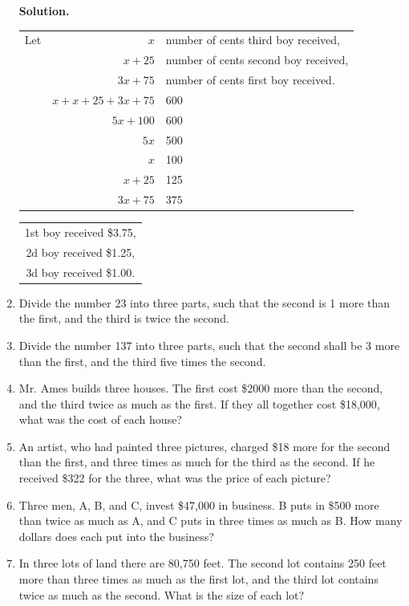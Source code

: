 \documentclass{book}
\begin{document}
\begin{enumerate}
\begin{center}
\textbf{ Solution.}\\
\begin{tabular}{lr@{=}l}
Let &$x$& number of cents third boy received,\\
&$x + 25$&  number of cents second boy received,\\
&$3x + 75$& number of cents first boy received.\\
&$x + x + 25 + 3x + 75$&  600\\
&$5x + 100$&  600\\
&$5x$& 500\\
&$x$& 100\\
&$x+ 25$& 125\\
&$3x + 75$& $375$\\
\end{tabular}
\begin{tabular}{c}
1st boy received \$3.75,\\
2d boy received \$1.25,\\
3d boy received \$1.00.\\
\end{tabular}
\end{center}

\item Divide the number 23 into three parts, such that the second
is 1 more than the first, and the third is twice the second.

\item Divide the number 137 into three parts, such that
the second shall be 3 more than the first, and the third
five times the second.

\item Mr. Ames builds three houses. The first cost \$2000
more than the second, and the third twice as much as the
first. If they all together cost \$18,000, what was the cost
of each house?

\item An artist, who had painted three pictures, charged
\$18 more for the second than the first, and three times as
much for the third as the second. If he received \$322 for
the three, what was the price of each picture?

\item Three men, A, B, and C, invest \$47,000 in business.
B puts in \$500 more than twice as much as A, and C puts
in three times as much as B. How many dollars does each
put into the business?

\item In three lots of land there are 80,750 feet. The
second lot contains 250 feet more than three times as
much as the first lot, and the third lot contains twice as
much as the second. What is the size of each lot?


\end{enumerate}
\end{document}
